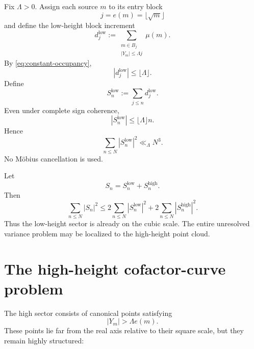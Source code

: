 \documentclass[11pt]{article}
\theoremstyle{definition}
\theoremstyle{remark}
\newcommand{\1}{\mathbf{1}}
\begin{document}
Fix $\Lambda>0$.  Assign each source $m$ to its entry block
\begin{equation}
 j=e(m)=\lfloor\sqrt m\rfloor
 \label{eq:entry-block}
\end{equation}
and define the low-height block increment
\begin{equation}
 d_j^{\mathrm{low}}
 :=
 \sum_{\substack{m\in B_j\\|Y_m|\le\Lambda j}}
 \mu(m).
 \label{eq:low-block-increment}
\end{equation}
By \cref{eq:constant-occupancy},
\begin{equation}
 |d_j^{\mathrm{low}}|
 \le\lfloor\Lambda\rfloor.
 \label{eq:low-block-bound}
\end{equation}
Define
\begin{equation}
 S_n^{\mathrm{low}}
 :=\sum_{j\le n}d_j^{\mathrm{low}}.
 \label{eq:low-prefix}
\end{equation}
Even under complete sign coherence,
\begin{equation}
 |S_n^{\mathrm{low}}|
 \le\lfloor\Lambda\rfloor n.
 \label{eq:low-prefix-bound}
\end{equation}
Hence
\begin{equation}
 \boxed{
 \sum_{n\le N}|S_n^{\mathrm{low}}|^2
 \ll_{\Lambda}N^3.
 }
 \label{eq:low-cubic}
\end{equation}
No M\"obius cancellation is used.

Let
\begin{equation}
 S_n=S_n^{\mathrm{low}}+S_n^{\mathrm{high}}.
 \label{eq:low-high-split}
\end{equation}
Then
\begin{equation}
 \sum_{n\le N}|S_n|^2
 \le
 2\sum_{n\le N}|S_n^{\mathrm{low}}|^2
 +
 2\sum_{n\le N}|S_n^{\mathrm{high}}|^2.
 \label{eq:energy-low-high}
\end{equation}
Thus the low-height sector is already on the cubic scale.  The entire unresolved variance problem may be localized to the high-height point cloud.

\section{The high-height cofactor-curve problem}
\label{sec:high-sector}

The high sector consists of canonical points satisfying
\begin{equation}
 |Y_m|>\Lambda e(m).
 \label{eq:high-sector}
\end{equation}
These points lie far from the real axis relative to their square scale,
but they remain highly structured:
\end{document}
